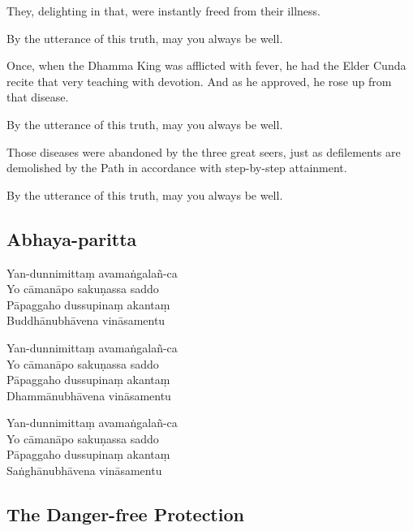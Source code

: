 \begin{paritta}
They, delighting in that, were instantly freed from their illness.

By the utterance of this truth, may you always be well.

Once, when the Dhamma King was afflicted with fever, he had the Elder Cunda
recite that very teaching with devotion. And as he approved, he rose up from
that disease.

By the utterance of this truth, may you always be well.

Those diseases were abandoned by the three great seers, just as defilements are
demolished by the Path in accordance with step-by-step attainment.

By the utterance of this truth, may you always be well.

\subsection{Abhaya-paritta}
\label{yan-dunnimittam}


\begin{paritta}
Yan-dunnimittaṃ avamaṅgalañ-ca\\
Yo cāmanāpo sakuṇassa saddo\\
Pāpaggaho dussupinaṃ akantaṃ\\
Buddhānubhāvena vināsamentu

Yan-dunnimittaṃ avamaṅgalañ-ca\\
Yo cāmanāpo sakuṇassa saddo\\
Pāpaggaho dussupinaṃ akantaṃ\\
Dhammānubhāvena vināsamentu

Yan-dunnimittaṃ avamaṅgalañ-ca\\
Yo cāmanāpo sakuṇassa saddo\\
Pāpaggaho dussupinaṃ akantaṃ\\
Saṅghānubhāvena vināsamentu
\end{paritta}

\bigskip

{\centering
\par}

\subsection{The Danger-free Protection}


\end{paritta}
